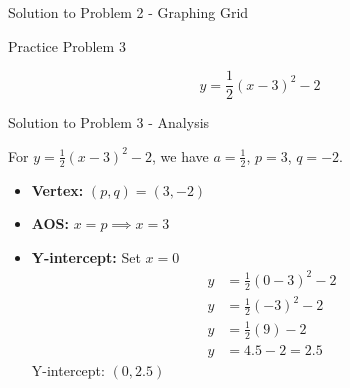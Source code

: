 \documentclass[aspectratio=169]{beamer}
\begin{document}
\begin{frame}{Solution to Problem 2 - Graphing Grid}
    \centering
\end{frame}

\begin{frame}{Practice Problem 3}
    \begin{tcolorbox}[colback=lightgray,colframe=primary,title=Problem 3]
        \footnotesize
        \[ y = \frac{1}{2}(x-3)^2 - 2 \]
    \end{tcolorbox}
\end{frame}

\begin{frame}{Solution to Problem 3 - Analysis}
    \begin{tcolorbox}[colback=lightgray,colframe=accent,title=Solution 3]
        \footnotesize
        For $y = \frac{1}{2}(x-3)^2 - 2$, we have $a=\frac{1}{2}$, $p=3$, $q=-2$.
        \begin{itemize}
            \item \textbf{Vertex:} $(p,q) = (3,-2)$
            \item \textbf{AOS:} $x = p \implies x = 3$
            \item \textbf{Y-intercept:} Set $x=0$
                \begin{align*}
                    y &= \frac{1}{2}(0-3)^2 - 2 \\
                    y &= \frac{1}{2}(-3)^2 - 2 \\
                    y &= \frac{1}{2}(9) - 2 \\
                    y &= 4.5 - 2 = 2.5
                \end{align*}
                Y-intercept: $(0, 2.5)$
        \end{itemize}
    \end{tcolorbox}
\end{frame}
\end{document}
